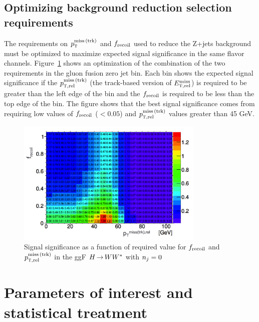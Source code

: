 \subsection{Optimizing background reduction selection requirements}

The requirements on $p_{\textrm{\footnotesize\sc t}}^{\rm miss\,(trk)}$ and $f_{\rm recoil}$ used to reduce the Z+jets background must be optimized to maximize expected signal significance in the same flavor channels. Figure~\ref{fig:optimization} shows an optimization of the combination of the two requirements in the gluon fusion zero jet bin. Each bin shows the expected signal significance if the $p_{{\textrm{\footnotesize\sc t}},{\rm rel}}^{\rm miss\,(trk)}$ (the track-based version of $E_{{\textrm{\footnotesize\sc t}},{\rm rel}}^{\rm miss}$) is required to be greater than the left edge of the bin and the $f_{\rm recoil}$ is required to be less than the top edge of the bin. The figure shows that the best signal significance comes from requiring low values of $f_{\rm recoil}$ ($< 0.05$) and $p_{{\textrm{\footnotesize\sc t}},{\rm rel}}^{\rm miss\,(trk)}$ values greater than 45 GeV. 

\begin{figure}[h!]
  \centering
  \captionsetup{justification=centering}

  \includegraphics[width=0.8\textwidth]{figures/SFoptimization}
  \caption{Signal significance as a function of required value for $f_{\rm recoil}$ and $p_{{\textrm{\footnotesize\sc t}},{\rm rel}}^{\rm miss\,(trk)}$ in the ggF $H{\,{\rightarrow}\,}WW^\ast$ with $n_j = 0$}
  \label{fig:optimization}
\end{figure}


\section{Parameters of interest and statistical treatment}
 
